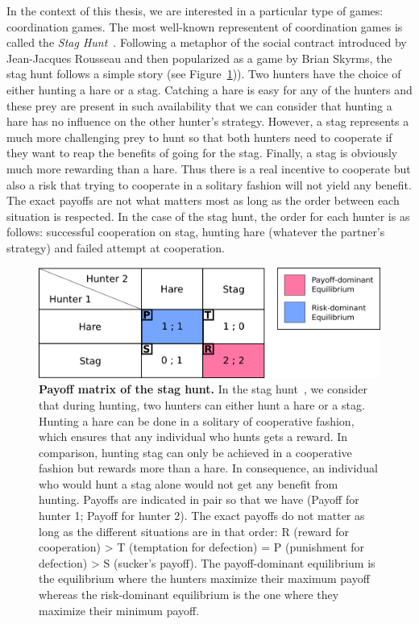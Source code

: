     In the context of this thesis, we are interested in a particular type of games: coordination games. The most well-known representent of coordination games is called the \emph{Stag Hunt}~\parencite{Skyrms2004}. Following a metaphor of the social contract introduced by Jean-Jacques Rousseau and then popularized as a game by Brian Skyrms, the stag hunt follows a simple story (see Figure~\ref{fig:MatrixStagHunt})). Two hunters have the choice of either hunting a hare or a stag. Catching a hare is easy for any of the hunters and these prey are present in such availability that we can consider that hunting a hare has no influence on the other hunter's strategy. However, a stag represents a much more challenging prey to hunt so that both hunters need to cooperate if they want to reap the benefits of going for the stag. Finally, a stag is obviously much more rewarding than a hare. Thus there is a real incentive to cooperate but also a risk that trying to cooperate in a solitary fashion will not yield any benefit. The exact payoffs are not what matters most as long as the order between each situation is respected. In the case of the stag hunt, the order for each hunter is as follows: successful cooperation on stag, hunting hare (whatever the partner's strategy) and failed attempt at cooperation.

    \begin{figure}[hbt]
        \begin{center}
          \includegraphics[scale = 0.50]{fig/Intro/StagHunt.png}
          \caption{\textbf{Payoff matrix of the stag hunt.} 
          In the stag hunt~\parencite{Skyrms2004}, we consider that during hunting, two hunters can either hunt a hare or a stag. Hunting a hare can be done in a solitary of cooperative fashion, which ensures that any individual who hunts gets a reward. In comparison, hunting stag can only be achieved in a cooperative fashion but rewards more than a hare. In consequence, an individual who would hunt a stag alone would not get any benefit from hunting. Payoffs are indicated in pair so that we have (Payoff for hunter 1; Payoff for hunter 2). The exact payoffs do not matter as long as the different situations are in that order: R (reward for cooperation) > T (temptation for defection) = P (punishment for defection) > S (sucker's payoff). The payoff-dominant equilibrium is the equilibrium where the hunters maximize their maximum payoff whereas the risk-dominant equilibrium is the one where they maximize their minimum payoff.} 
          \label{fig:MatrixStagHunt}
        \end{center}
    \end{figure}

